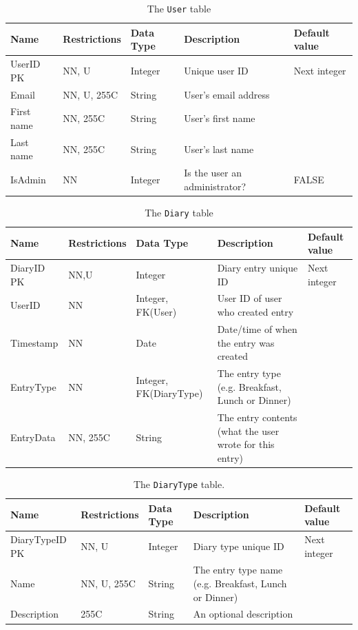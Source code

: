\documentclass[a4paper, 11pt, titlepage]{article}
\begin{document}
\begin{table}[H]
  \centering
  \caption{The \texttt{User} table}
    \begin{tabularx}{\textwidth}{lllXl}
    \hline
    Name  & Restrictions & Data Type & Description & Default value \\
    \hline
    UserID PK & NN, U & Integer & Unique user ID & Next integer \\
    Email & NN, U, 255C & String & User's email address &  \\
    First name & NN, 255C & String & User's first name &  \\
    Last name & NN, 255C & String & User's last name &  \\
    IsAdmin & NN    & Integer & Is the user an administrator? & FALSE \\
    \hline
    \end{tabularx}%
  \label{tab:dd:User}%
\end{table}%


\begin{table}[H]
  \centering
  \caption{The \texttt{Diary} table}
    \begin{tabularx}{\textwidth}{llp{2.5cm}Xl}
    \hline
    Name  & Restrictions & Data Type & Description & Default value \\
    \hline
    DiaryID PK & NN,U  & Integer & Diary entry unique ID & Next integer \\
    UserID & NN    & Integer, FK(User) & User ID of user who created entry &  \\
    Timestamp & NN    & Date  & Date/time of when the entry was created &  \\
    EntryType & NN    & Integer, FK(DiaryType) & The entry type (e.g. Breakfast, Lunch or Dinner) &  \\
    EntryData & NN, 255C & String & The entry contents (what the user wrote for this entry) &  \\
    \hline
    \end{tabularx}%
  \label{tab:dd:Diary}%
\end{table}%


\begin{table}[H]
  \centering
  \caption{The \texttt{DiaryType} table.}
    \begin{tabularx}{\textwidth}{lllXl}
    \hline
    Name  & Restrictions & Data Type & Description & Default value \\
    \hline
    DiaryTypeID PK & NN, U & Integer & Diary type unique ID & Next integer \\
    Name  & NN, U, 255C & String & The entry type name (e.g. Breakfast, Lunch or Dinner) &  \\
    Description & 255C  & String & An optional description &  \\
    \hline
    \end{tabularx}%
  \label{tab:dd:DiaryType}%
\end{table}%
\end{document}
